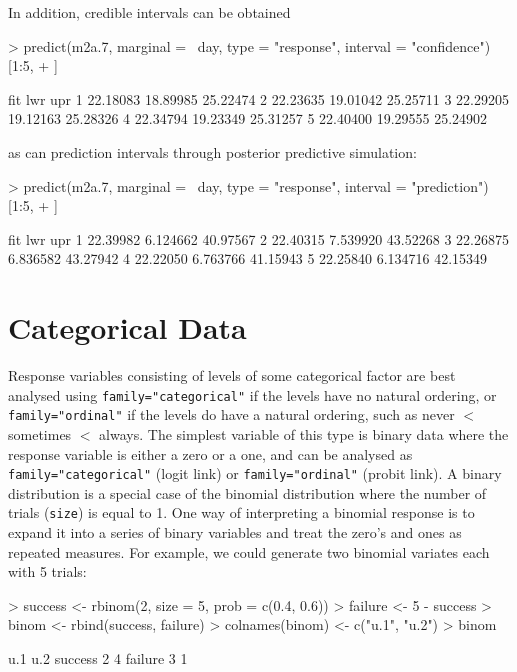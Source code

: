 \documentclass{article}
\begin{document}
In addition, credible intervals can be obtained 

\begin{Schunk}
\begin{Sinput}
> predict(m2a.7, marginal = ~day, type = "response", interval = "confidence")[1:5, 
+     ]
\end{Sinput}
\begin{Soutput}
       fit      lwr      upr
1 22.18083 18.89985 25.22474
2 22.23635 19.01042 25.25711
3 22.29205 19.12163 25.28326
4 22.34794 19.23349 25.31257
5 22.40400 19.29555 25.24902
\end{Soutput}
\end{Schunk}

as can prediction intervals through posterior predictive simulation:

\begin{Schunk}
\begin{Sinput}
> predict(m2a.7, marginal = ~day, type = "response", interval = "prediction")[1:5, 
+     ]
\end{Sinput}
\begin{Soutput}
       fit      lwr      upr
1 22.39982 6.124662 40.97567
2 22.40315 7.539920 43.52268
3 22.26875 6.836582 43.27942
4 22.22050 6.763766 41.15943
5 22.25840 6.134716 42.15349
\end{Soutput}
\end{Schunk}

\section{Categorical Data}

Response variables consisting of levels of some categorical factor are best analysed using \texttt{family="categorical"} if the levels have no natural ordering,  or \texttt{family="ordinal"} if the levels do have a natural ordering, such as never $<$ sometimes $<$ always. The simplest variable of this type is binary data where the response variable is either a zero or a one, and can be analysed as \texttt{family="categorical"} (logit link) or \texttt{family="ordinal"} (probit link).   A binary distribution is a special case of the binomial distribution where the number of trials (\texttt{size}) is equal to 1. One way of interpreting a binomial response is to expand it into a series of binary variables and treat the zero's and ones as repeated measures. For example, we could generate two binomial variates each with 5 trials:

\begin{Schunk}
\begin{Sinput}
> success <- rbinom(2, size = 5, prob = c(0.4, 0.6))
> failure <- 5 - success
> binom <- rbind(success, failure)
> colnames(binom) <- c("u.1", "u.2")
> binom
\end{Sinput}
\begin{Soutput}
        u.1 u.2
success   2   4
failure   3   1
\end{Soutput}
\end{Schunk}
\end{document}
